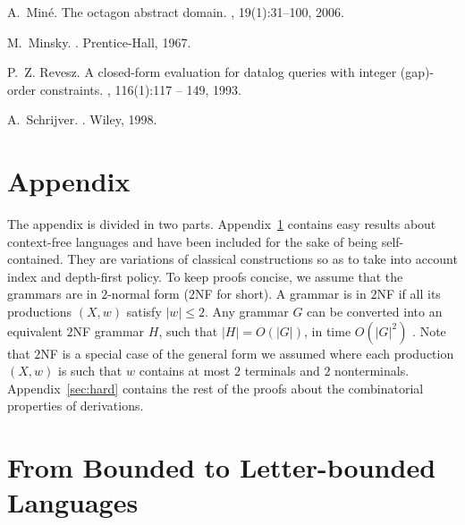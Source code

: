 \documentclass[final]{llncs}
\def\len#1{{\vert{#1}\vert}}
\begin{document}
\begin{thebibliography}{10}
A.~Min{\'{e}}.
\newblock The octagon abstract domain.
, 19(1):31--100, 2006.

M.~Minsky.
.
\newblock Prentice-Hall, 1967.

P.~Z. Revesz.
\newblock A closed-form evaluation for datalog queries with integer (gap)-order
  constraints.
, 116(1):117 -- 149, 1993.

A.~Schrijver.
.
\newblock Wiley, 1998.

\end{thebibliography}



\clearpage
\appendix

\section*{Appendix}

The appendix is divided in two parts. Appendix~\ref{sec:easy} contains
easy results about context-free languages and have been included for the sake of being
self-contained. They are variations of classical constructions so as to
take into account index and depth-first
policy. To keep proofs concise, we assume that the grammars are in \(2\)-normal form (\(2\)NF for short).
A grammar is in \(2\)NF if all its productions \( (X,w)\) satisfy \(\len{w}\leq 2\).
Any grammar \(G\) can be converted into an equivalent \(2\)NF grammar \(H\), such that \(\len{H} = O(\len{G})\),
in time \(O(\len{G}^2)\) \cite{LL10}. Note that \(2\)NF is a special case of the general form we assumed
where each production \( (X,w) \) is such that \(w\) contains at most \(2\) terminals and \(2\) nonterminals.
Appendix~\ref{sec:hard} contains the rest of the proofs about
the combinatorial properties of derivations.

\section{From Bounded to Letter-bounded Languages}\label{sec:easy}
\end{document}

